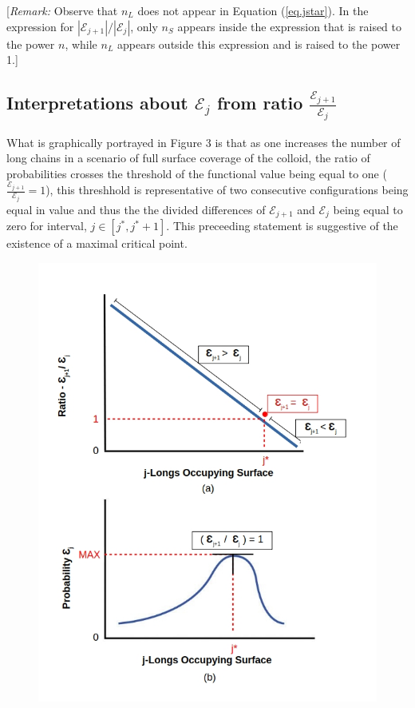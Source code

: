 \documentclass[journal=mamobx,manuscript=article]{achemso}
\begin{document}
[\textit{Remark:}  Observe that $n_L$ does not appear in Equation (\ref{eq.jstar}).  
In the expression for $|\mathcal{E}_{j+1}|/|\mathcal{E}_j|$,   only $n_S$ appears inside the 
expression that is raised to the power $n$, while $n_L$ appears outside this expression and is
raised to the power 1.]  

\subsection{Interpretations about $\mathcal{E}_{j}$ from ratio $\frac{\mathcal{E}_{j+1}}{\mathcal{E}_{j}}$}



What is graphically portrayed in Figure 3 is that as one increases the number of long chains in a scenario of full surface coverage of the colloid, the ratio of probabilities crosses the threshold of the functional value being equal to one ($\frac{\mathcal{E}_{j+1}}{\mathcal{E}_{j}}=1$), this threshhold is representative of two consecutive configurations being equal in value and thus the the divided differences of $\mathcal{E}_{j+1}$ and $\mathcal{E}_{j}$ being equal to zero for interval,  $j\in[j^*, j^*+1]$. This preceeding statement is suggestive of the existence of a maximal critical point. 

\begin{figure}[H]
\includegraphics[scale=0.50]{fig9ab.jpg}
\caption{}
\label{figure 9}
\end{figure}
\end{document}
